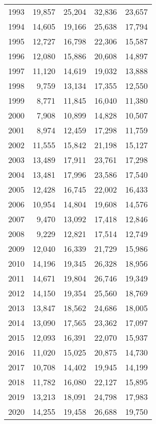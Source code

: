 \documentclass[11pt]{book}
\begin{document}
\begin{longtable}[]{@{}lrrrr@{}}
1993 & 19,857 & 25,204 & 32,836 & 23,657\tabularnewline
1994 & 14,605 & 19,166 & 25,638 & 17,794\tabularnewline
1995 & 12,727 & 16,798 & 22,306 & 15,587\tabularnewline
1996 & 12,080 & 15,886 & 20,608 & 14,897\tabularnewline
1997 & 11,120 & 14,619 & 19,032 & 13,888\tabularnewline
1998 & 9,759 & 13,134 & 17,355 & 12,550\tabularnewline
1999 & 8,771 & 11,845 & 16,040 & 11,380\tabularnewline
2000 & 7,908 & 10,899 & 14,828 & 10,507\tabularnewline
2001 & 8,974 & 12,459 & 17,298 & 11,759\tabularnewline
2002 & 11,555 & 15,842 & 21,198 & 15,127\tabularnewline
2003 & 13,489 & 17,911 & 23,761 & 17,298\tabularnewline
2004 & 13,481 & 17,996 & 23,586 & 17,540\tabularnewline
2005 & 12,428 & 16,745 & 22,002 & 16,433\tabularnewline
2006 & 10,954 & 14,804 & 19,608 & 14,576\tabularnewline
2007 & 9,470 & 13,092 & 17,418 & 12,846\tabularnewline
2008 & 9,229 & 12,821 & 17,514 & 12,749\tabularnewline
2009 & 12,040 & 16,339 & 21,729 & 15,986\tabularnewline
2010 & 14,196 & 19,345 & 26,328 & 18,956\tabularnewline
2011 & 14,671 & 19,804 & 26,746 & 19,349\tabularnewline
2012 & 14,150 & 19,354 & 25,560 & 18,769\tabularnewline
2013 & 13,847 & 18,562 & 24,686 & 18,005\tabularnewline
2014 & 13,090 & 17,565 & 23,362 & 17,097\tabularnewline
2015 & 12,093 & 16,391 & 22,070 & 15,937\tabularnewline
2016 & 11,020 & 15,025 & 20,875 & 14,730\tabularnewline
2017 & 10,708 & 14,402 & 19,945 & 14,199\tabularnewline
2018 & 11,782 & 16,080 & 22,127 & 15,895\tabularnewline
2019 & 13,213 & 18,091 & 24,798 & 17,983\tabularnewline
2020 & 14,255 & 19,458 & 26,688 & 19,750\tabularnewline
\bottomrule
\end{longtable}
\end{document}
